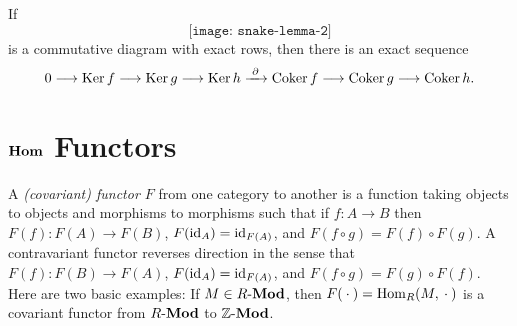 \begin{theorem}
  If
  \[
    \texttt{[image: snake-lemma-2]}
  \]
  is a commutative diagram with exact rows, then there is an exact sequence
  \[
    0\longrightarrow\operatorname{Ker} f
    \longrightarrow\operatorname{Ker} g
    \longrightarrow\operatorname{Ker} h
    \xrightarrow{\,\,\partial\,\,}\operatorname{Coker} f
    \longrightarrow\operatorname{Coker} g
    \longrightarrow\operatorname{Coker} h.
  \]
\end{theorem}
\section[\(\Hom\) Functors]{\(\boldsymbol{\operatorname{Hom}}\) Functors}
A \emph{(covariant) functor \(F\)} from one category to another is a
function taking objects to objects and morphisms to morphisms such that if
\(f\colon A\to B\) then \(F(f)\colon F(A)\to F(B)\),
\(F(\operatorname{id}_A)=\operatorname{id}_{F(A)}\), and \(F(f\circ g)=F(f)\circ F(g)\). A
contravariant functor reverses direction in the sense that
\(F(f)\colon F(B)\to F(A)\), \(F(\operatorname{id}_A)=\operatorname{id}_{F(A)}\), and
\(F(f\circ g)=F(g)\circ F(f)\). Here are two basic examples: If
\(M\in R\textnormal{-}\mathbf{Mod}\), then \(F({}\cdot{})=\operatorname{Hom}_R(M,{}\cdot{})\) is a covariant functor
from \(R\textnormal{-}\mathbf{Mod}\) to \(\mathbb{Z}\textnormal{-}\mathbf{Mod}\).

